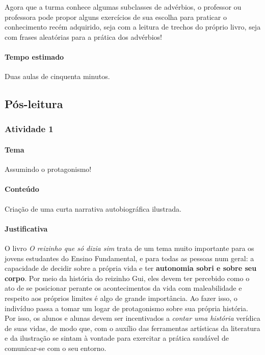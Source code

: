 \documentclass[11pt]{extarticle}
\begin{document}

Agora que a turma conhece algumas subclasses de advérbios, o professor ou professora
pode propor alguns exercícios de sua escolha para praticar o conhecimento recém adquirido,
seja com a leitura de trechos do próprio livro, seja com frases aleatórias para a prática
dos advérbios!


\paragraph{Tempo estimado} Duas aulas de cinquenta minutos.


\subsection{Pós-leitura}

\subsubsection{Atividade 1}

\paragraph{Tema} Assumindo o protagonismo! 

\paragraph{Conteúdo} Criação de uma curta narrativa autobiográfica ilustrada.

\paragraph{Justificativa} O livro \textit{O reizinho que só dizia sim}
trata de um tema muito importante para os jovens estudantes do Ensino Fundamental,
e para todas as pessoas num geral: a capacidade de decidir sobre a própria
vida e ter \textbf{autonomia sobri e sobre seu corpo}. 
Por meio da história do reizinho Gui, 
eles devem ter percebido como o ato de se posicionar perante os acontecimentos
da vida com maleabilidade e respeito aos próprios limites é algo de grande importância.
Ao fazer isso, o indivíduo passa a tomar um logar de protagonismo sobre sua própria história.
Por isso, os alunos e alunas devem ser incentivados a \textit{contar uma história}
verídica de suas vidas, de modo que, com o auxílio das ferramentas artísticas
da literatura e da ilustração se sintam à vontade para exercitar a prática saudável de 
comunicar-se com o seu entorno. 
\end{document}
